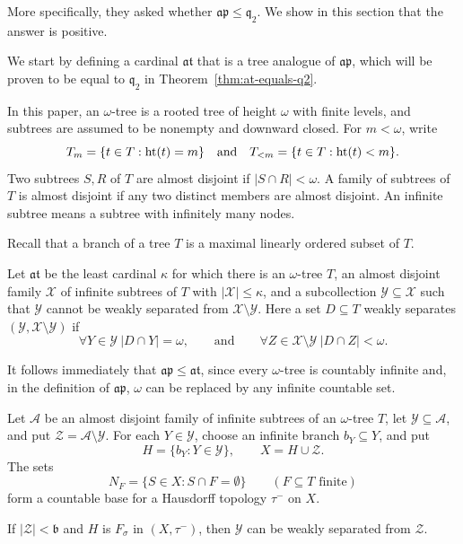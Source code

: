 More specifically, they asked whether $\mathfrak{ap}\leq \mathfrak q_2$.
We show in this section that the answer is positive.

We start by defining a cardinal $\mathfrak{at}$ that is a tree analogue of $\mathfrak{ap}$, which will be proven to be equal to $\mathfrak q_2$ in Theorem~\ref{thm:at-equals-q2}.

In this paper, an $\omega$-tree is a rooted tree of height $\omega$ with finite levels, and subtrees are assumed to be nonempty and downward closed.  For $m<\omega$, write
\[
  T_m=\{t\in T:\operatorname{ht}(t)=m\}
  \quad\text{and}\quad
  T_{<m}=\{t\in T:\operatorname{ht}(t)<m\}.
\]
Two subtrees $S,R$ of $T$ are almost disjoint if $|S\cap R|<\omega$.
A family of subtrees of $T$ is almost disjoint if any two distinct members are almost disjoint.
An infinite subtree means a subtree with infinitely many nodes.

Recall that a branch of a tree $T$ is a maximal linearly ordered subset of $T$.

\begin{definition}\label{def:at}
Let $\mathfrak{at}$ be the least cardinal $\kappa$ for which there is an
$\omega$-tree $T$, an almost disjoint family $\mathcal X$ of infinite subtrees of $T$ with $|\mathcal X|\leq \kappa$, and a subcollection
$\mathcal Y\subseteq\mathcal X$ such that $\mathcal Y$ cannot be weakly
separated from $\mathcal X\setminus\mathcal Y$.
Here a set $D\subseteq T$
weakly separates $(\mathcal Y,\mathcal X\setminus\mathcal Y)$ if
\[
  \forall Y\in\mathcal Y\ |D\cap Y|=\omega,
  \qquad \text{and}\qquad
  \forall Z\in\mathcal X\setminus\mathcal Y\ |D\cap Z|<\omega.
\]
\end{definition}

It follows immediately that $\mathfrak{ap}\leq \mathfrak{at}$, since every $\omega$-tree is countably infinite and, in the definition of $\mathfrak{ap}$, $\omega$ can be replaced by any infinite countable set.


\begin{lemma}\label{lem:tree-fsigma-separator}
Let $\mathcal A$ be an almost disjoint family of infinite subtrees of an
$\omega$-tree $T$, let $\mathcal Y\subseteq\mathcal A$, and put
$\mathcal Z=\mathcal A\setminus\mathcal Y$.
For each $Y\in\mathcal Y$, choose an infinite branch $b_Y\subseteq Y$, and put
\[
  H=\{b_Y:Y\in\mathcal Y\},\qquad X=H\cup\mathcal Z.
\]
The sets
\[
  N_F=\{S\in X:S\cap F=\emptyset\}\qquad(F\subseteq T\text{ finite})
\]
form a countable base for a Hausdorff topology $\tau^-$ on $X$.

If $|\mathcal Z|<\mathfrak b$ and $H$ is $F_\sigma$ in $(X,\tau^-)$,
then $\mathcal Y$ can be weakly separated from $\mathcal Z$.
\end{lemma}

